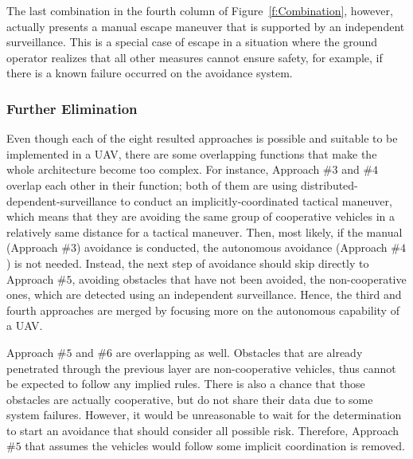 The last combination in the fourth column of Figure~\ref{f:Combination}, however, actually presents a manual escape maneuver that is supported by an independent surveillance. This is a special case of escape in a situation where the ground operator realizes that all other measures cannot ensure safety, for example, if there is a known failure occurred on the avoidance system.

\subsubsection{Further Elimination}
Even though each of the eight resulted approaches is possible and suitable to be implemented in a UAV, there are some overlapping functions that make the whole architecture become too complex. For instance, Approach $\#3$ and $\#4$ overlap each other in their function; both of them are using distributed-dependent-surveillance to conduct an implicitly-coordinated tactical maneuver, which means that they are avoiding the same group of cooperative vehicles in a relatively same distance for a tactical maneuver. Then, most likely, if the manual (Approach $\#3$) avoidance is conducted, the autonomous avoidance (Approach $\#4$) is not needed. Instead, the next step of avoidance should skip directly to Approach $\#5$, avoiding obstacles that have not been avoided, the non-cooperative ones, which are detected using an independent surveillance. Hence, the third and fourth approaches are merged by focusing more on the autonomous capability of a UAV.

Approach $\#5$ and $\#6$ are overlapping as well. Obstacles that are already penetrated through the previous layer are non-cooperative vehicles, thus cannot be expected to follow any implied rules. There is also a chance that those obstacles are actually cooperative, but do not share their data due to some system failures. However, it would be unreasonable to wait for the determination to start an avoidance that should consider all possible risk. Therefore, Approach $\#5$ that assumes the vehicles would follow some implicit coordination is removed. 

